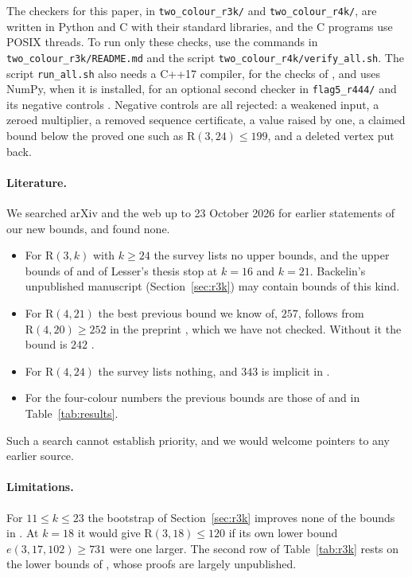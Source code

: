 \documentclass[11pt]{article}
\theoremstyle{spacedplain}
\theoremstyle{spaceddef}
\theoremstyle{spacedremark}
\newcommand{\R}{\mathrm{R}}
\begin{document}
The checkers for this paper, in \texttt{two\_colour\_r3k/} and \texttt{two\_colour\_r4k/}, are written in Python and C with their standard libraries, and the C programs use POSIX threads.
To run only these checks, use the commands in \texttt{two\_colour\_r3k/README.md} and the script \texttt{two\_colour\_r4k/verify\_all.sh}.
The script \texttt{run\_all.sh} also needs a C++17 compiler, for the checks of \cite{DC26}, and uses NumPy, when it is installed, for an optional second checker in \texttt{flag5\_r444/} and its negative controls \cite[Section~10]{DC26}.
Negative controls are all rejected: a weakened input, a zeroed multiplier, a removed sequence certificate, a value raised by one, a claimed bound below the proved one such as $\R(3,24)\le 199$, and a deleted vertex put back.

\paragraph{Literature.}
We searched arXiv and the web up to 23 October 2026 for earlier statements of our new bounds, and found none.
\begin{itemize}
\item For $\R(3,k)$ with $k\ge 24$ the survey lists no upper bounds, and the upper bounds of \cite{GR13} and of Lesser's thesis \cite{Les} stop at $k=16$ and $k=21$.
Backelin's unpublished manuscript (Section~\ref{sec:r3k}) may contain bounds of this kind.
\item For $\R(4,21)$ the best previous bound we know of, $257$, follows from $\R(4,20)\ge 252$ in the preprint \cite{Yu26}, which we have not checked.
Without it the bound is $242$ \cite{SLZL}.
\item For $\R(4,24)$ the survey lists nothing, and $343$ is implicit in \cite{LinCa}.
\item For the four-colour numbers the previous bounds are those of \cite{Rad26} and \cite{Boz26} in Table~\ref{tab:results}.
\end{itemize}
Such a search cannot establish priority, and we would welcome pointers to any earlier source.

\paragraph{Limitations.}
For $11\le k\le 23$ the bootstrap of Section~\ref{sec:r3k} improves none of the bounds in \cite{Rad26}.
At $k=18$ it would give $\R(3,18)\le 120$ if its own lower bound $e(3,17,102)\ge 731$ were one larger.
The second row of Table~\ref{tab:r3k} rests on the lower bounds of \cite{Back3}, whose proofs are largely unpublished.
\end{document}
